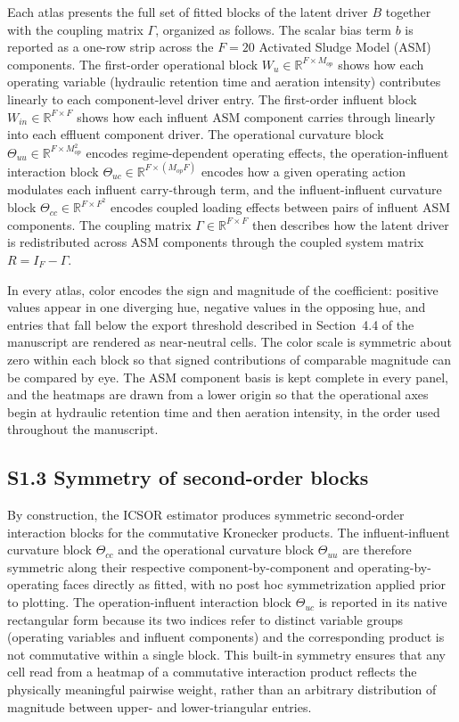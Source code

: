 \documentclass[a4paper,11pt]{article}
\begin{document}
Each atlas presents the full set of fitted blocks of the latent driver $B$ together with the coupling matrix $\Gamma$, organized as follows. The scalar bias term $b$ is reported as a one-row strip across the $F = 20$ Activated Sludge Model (ASM) components. The first-order operational block $W_u \in \mathbb{R}^{F \times M_{op}}$ shows how each operating variable (hydraulic retention time and aeration intensity) contributes linearly to each component-level driver entry. The first-order influent block $W_{in} \in \mathbb{R}^{F \times F}$ shows how each influent ASM component carries through linearly into each effluent component driver. The operational curvature block $\Theta_{uu} \in \mathbb{R}^{F \times M_{op}^2}$ encodes regime-dependent operating effects, the operation-influent interaction block $\Theta_{uc} \in \mathbb{R}^{F \times (M_{op} F)}$ encodes how a given operating action modulates each influent carry-through term, and the influent-influent curvature block $\Theta_{cc} \in \mathbb{R}^{F \times F^2}$ encodes coupled loading effects between pairs of influent ASM components. The coupling matrix $\Gamma \in \mathbb{R}^{F \times F}$ then describes how the latent driver is redistributed across ASM components through the coupled system matrix $R = I_F - \Gamma$.

In every atlas, color encodes the sign and magnitude of the coefficient: positive values appear in one diverging hue, negative values in the opposing hue, and entries that fall below the export threshold described in Section~4.4 of the manuscript are rendered as near-neutral cells. The color scale is symmetric about zero within each block so that signed contributions of comparable magnitude can be compared by eye. The ASM component basis is kept complete in every panel, and the heatmaps are drawn from a lower origin so that the operational axes begin at hydraulic retention time and then aeration intensity, in the order used throughout the manuscript.

\subsection*{S1.3 Symmetry of second-order blocks}

By construction, the ICSOR estimator produces symmetric second-order interaction blocks for the commutative Kronecker products. The influent-influent curvature block $\Theta_{cc}$ and the operational curvature block $\Theta_{uu}$ are therefore symmetric along their respective component-by-component and operating-by-operating faces directly as fitted, with no post hoc symmetrization applied prior to plotting. The operation-influent interaction block $\Theta_{uc}$ is reported in its native rectangular form because its two indices refer to distinct variable groups (operating variables and influent components) and the corresponding product is not commutative within a single block. This built-in symmetry ensures that any cell read from a heatmap of a commutative interaction product reflects the physically meaningful pairwise weight, rather than an arbitrary distribution of magnitude between upper- and lower-triangular entries.
\end{document}
